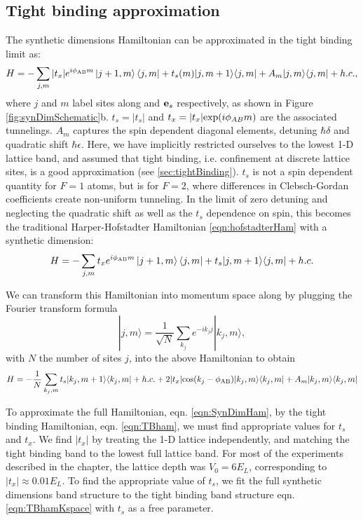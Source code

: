 \subsection{Tight binding approximation}

The synthetic dimensions Hamiltonian can be approximated in the tight binding limit as:
\begin{equation}
H=-\sum_{j,m} |t_x| e^{i\phi_{\rm AB}m}\mathinner{|{j+1,m}\rangle}\mathinner{\langle{j,m}|}+t_s(m)|j,m+1\rangle\langle j,m| + A_m|j,m\rangle\langle j,m| + h.c.,
\label{eqn:TBham}
\end{equation}
where $j$ and $m$ label sites along \ex{} and $\textbf{e}_s{}$ respectively, as shown in Figure \ref{fig:synDimSchematic}b. $t_s=|t_s|$ and $t_x=|t_x|{\rm exp}(i\phi_{AB}m)$ are the associated tunnelings. $A_m$ captures the spin dependent diagonal elements, detuning $\hbar\delta$ and quadratic shift $\hbar\epsilon$. Here, we have implicitly restricted ourselves to the lowest 1-D lattice band, and assumed that tight binding, i.e. confinement at discrete lattice sites, is a good approximation (see \ref{sec:tightBinding}).  $t_s$ is not a spin dependent quantity for $F=1$ atoms, but is for $F=2$, where differences in Clebsch-Gordan coefficients create non-uniform tunneling. In the limit of zero detuning and neglecting the quadratic shift as well as the $t_s$ dependence on spin, this becomes the traditional Harper-Hofstadter Hamiltonian \ref{eqn:hofstadterHam} with a synthetic dimension:
\begin{equation}
H=-\sum_{j,m} t_x e^{i\phi_{\rm AB}m}\mathinner{|{j+1,m}\rangle}\mathinner{\langle{j,m}|}+t_s|j,m+1\rangle\langle j,m| +  h.c.
\label{eqn:TBhamFlat}
\end{equation} 

We can transform this Hamiltonian into momentum space along \ex{} by plugging the Fourier transform formula 
\begin{equation}
|j,m\rangle = \frac{1}{\sqrt{N}}\sum_{k_j}e^{-ik_j j}|k_j,m\rangle,
\end{equation}
with $N$ the number of sites $j$, into the above Hamiltonian to obtain 
\begin{equation}
H=-\frac{1}{N}\sum_{k_j,m}t_s|k_j,m+1\rangle\langle k_j,m| + h.c. +2|t_x|{\rm cos}(k_j-\phi_{\rm AB})|k_j,m\rangle\langle k_j,m| + A_m|k_j,m\rangle\langle k_j,m|
\label{eqn:TBhamKspace}
\end{equation}

To approximate the full Hamiltonian, eqn. \ref{eqn:SynDimHam}, by the tight binding Hamiltonian, eqn. \ref{eqn:TBham}, we must find appropriate values for $t_s$ and $t_x$. We find $|t_x|$ by treating the 1-D lattice independently, and matching the tight binding band to the lowest full lattice band. For most of the experiments described in the chapter, the lattice depth was $V_0=6E_L$, corresponding to $|t_x|\approx0.01 E_L$. To find the appropriate value of $t_s$, we fit the full synthetic dimensions band structure to the tight binding band structure eqn. \ref{eqn:TBhamKspace} with $t_s$ as a free parameter. 

